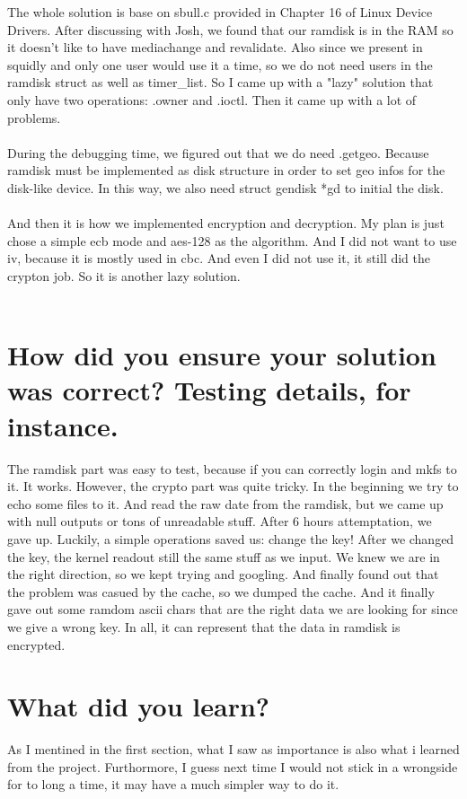 \documentclass[12pt,letterpaper]{article}
\begin{document}
\indent The whole solution is base on sbull.c provided in Chapter 16 of Linux Device Drivers. After discussing with Josh, we found that our ramdisk is in the RAM so it doesn't like to have mediachange and revalidate. Also since we present in squidly and only one user would use it a time, so we do not need users in the ramdisk struct as well as timer\_list. So I came up with a "lazy" solution that only have two operations: .owner and .ioctl. Then it came up with a lot of problems.\\\\
\indent During the debugging time, we figured out that we do need .getgeo. Because ramdisk must be implemented as disk structure in order to set geo infos for the disk-like device. In this way, we also need struct gendisk *gd to initial the disk. \\\\
\indent And then it is how we implemented encryption and decryption. My plan is just chose a simple ecb mode and aes-128 as the algorithm. And I did not want to use iv, because it is mostly used in cbc. And even I did not use it, it still did the crypton job. So it is another lazy solution.\\\\

\section{How did you ensure your solution was correct? Testing details, for instance.}

\indent The ramdisk part was easy to test, because if you can correctly login and mkfs to it. It works. However, the crypto part was quite tricky. In the beginning we try to echo some files to it. And read the raw date from the ramdisk, but we came up with null outputs or tons of unreadable stuff. After 6 hours attemptation, we gave up. Luckily, a simple operations saved us: change the key! After we changed the key, the kernel readout still the same stuff as we input. We knew we are in the right direction, so we kept trying and googling. And finally found out that the problem was casued by the cache, so we dumped the cache. And it finally gave out some ramdom ascii chars that are the right data we are looking for since we give a wrong key. In all, it can represent that the data in ramdisk is encrypted.

\section{What did you learn?}

\indent As I mentined in the first section, what I saw as importance is also what i learned from the project. Furthormore, I guess next time I would not stick in a wrongside for to long a time, it may have a much simpler way to do it.
\end{document}
